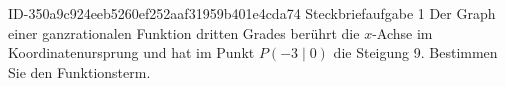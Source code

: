 \begin{exercise}
      {ID-350a9c924eeb5260ef252aaf31959b401e4cda74}
      {Steckbriefaufgabe 1}
  \ifproblem\problem
    Der Graph einer ganzrationalen Funktion dritten Grades berührt die
    $x$-Achse im Koordinatenursprung und hat im Punkt $P(-3\mid0)$ die
    Steigung \num{9}. Bestimmen Sie den Funktionsterm.
  \fi
\end{exercise}
